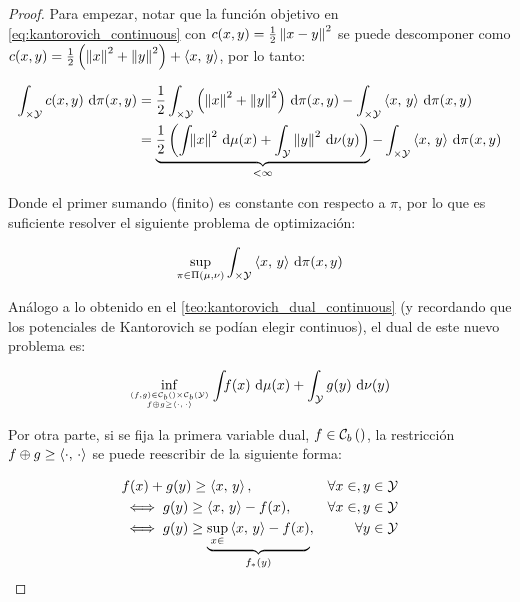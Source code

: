 \begin{proof}
	Para empezar, notar que la función objetivo en \eqref{eq:kantorovich_continuous} con $c(x,y)=\frac{1}{2}\left\lVert x-y \right\rVert^2$ se puede descomponer como $c(x,y)=\frac{1}{2}\left(\left\lVert x \right\rVert^2+\left\lVert y \right\rVert^2\right)+\left\langle x,\,y\right\rangle$, por lo tanto:

	\begin{align*}
		\int_{\times\mathcal{Y}} c(x,y) \,\operatorname{d}\!\pi(x,y) & = \frac{1}{2}\int_{\times\mathcal{Y}} \left(\left\lVert x \right\rVert^2 + \left\lVert y \right\rVert^2\right) \,\operatorname{d}\!\pi(x,y) - \int_{\times\mathcal{Y}} \left\langle x,\,y\right\rangle \,\operatorname{d}\!\pi(x,y)                                 \\
		                                        & = \underbrace{\frac{1}{2}\left(\int_{} \left\lVert x \right\rVert^2 \,\operatorname{d}\!\mu(x) + \int_{\mathcal{Y}} \left\lVert y \right\rVert^2 \,\operatorname{d}\!\nu(y)\right)}_{<\infty} - \int_{\times\mathcal{Y}} \left\langle x,\,y\right\rangle \,\operatorname{d}\!\pi(x,y)
	\end{align*}

	Donde el primer sumando (finito) es constante con respecto a $\pi$, por lo que es suficiente resolver el siguiente problema de optimización:

	\begin{equation*}
		\sup_{\pi\in\Pi(\mu,\nu)} \int_{\times\mathcal{Y}} \left\langle x,\,y\right\rangle \,\operatorname{d}\!\pi(x,y)
	\end{equation*}

	Análogo a lo obtenido en el \autoref{teo:kantorovich_dual_continuous} (y recordando que los potenciales de Kantorovich se podían elegir continuos), el dual de este nuevo problema es:

	\begin{equation}
		\label{eq:brenier_dual}
		\inf_{\feasible{(f,g)\in \continuousb{\xspace}\times\continuousb{\yspace}}{f\oplus g \geq \dotproduct{\cdot}{\cdot}}}
		\int_{\xspace} f(x) \d\mu(x) + \int_{\yspace} g(y) \d\nu(y)
	\end{equation}

	Por otra parte, si se fija la primera variable dual, $f\in \mathcal{C}_b\left(\right)$, la restricción $f\oplus g \geq \left\langle \cdot,\,\cdot\right\rangle$ se puede reescribir de la siguiente forma:

	\begin{alignat*}{3}
		& f(x)+g(y) \geq \left\langle x,\,y\right\rangle, &\forall x\in,y\in\mathcal{Y}                                           \\
		 & \iff g(y) \geq \left\langle x,\,y\right\rangle - f(x), &\forall x\in,y\in\mathcal{Y}                                  \\
		 & \iff g(y) \geq \underbrace{\sup_{x\in} \left\langle x,\,y\right\rangle - f(x)}_{f_*(y)}, &\forall y\in\mathcal{Y}  
	\end{alignat*}


\end{proof}

